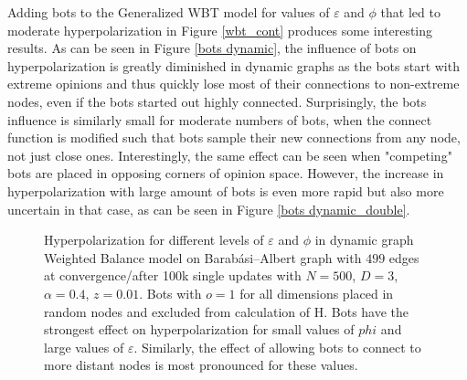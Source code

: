 \documentclass[11pt]{article}
\begin{document}
Adding bots to the Generalized WBT model for values of $\varepsilon$ and $\phi$ that led to moderate hyperpolarization in Figure \ref{wbt_cont} produces some interesting results. As can be seen in Figure \ref{bots dynamic}, the influence of bots on hyperpolarization is greatly diminished in dynamic graphs as the bots start with extreme opinions and thus quickly lose most of their connections to non-extreme nodes, even if the bots started out highly connected. Surprisingly, the bots influence is similarly small for moderate numbers of bots, when the connect function is modified such that bots sample their new connections from any node, not just close ones. Interestingly, the same effect can be seen when "competing" bots are placed in opposing corners of opinion space. However, the increase in hyperpolarization with large amount of bots is even more rapid but also more uncertain in that case, as can be seen in Figure \ref{bots dynamic_double}. 
\begin{figure}[h!]
\caption{Hyperpolarization for different levels of $\varepsilon$ and $\phi$ in  dynamic graph Weighted Balance model on Barabási–Albert graph with $499$ edges at convergence/after 100k single updates with $N=500$, $D=3$, $\alpha=0.4$, $z=0.01$. Bots with $o=1$ for all dimensions placed in random nodes and excluded from calculation of H. Bots have the strongest effect on hyperpolarization for small values of $phi$ and large values of $\varepsilon$. Similarly, the effect of allowing bots to connect to more distant nodes is most pronounced for these values. 
}
\label{bots contour}
\end{figure}
\end{document}
